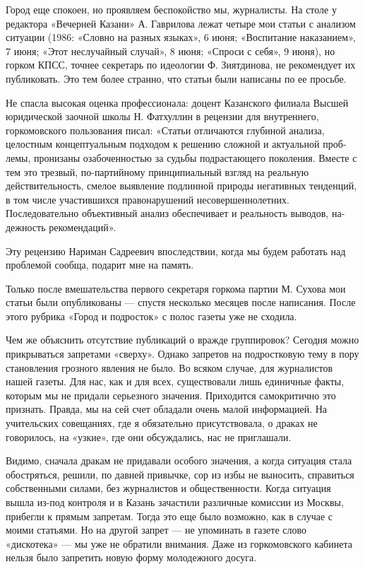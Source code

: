\documentclass[12pt, a4paper, openany]{book}
\begin{document}
Город еще спокоен, но проявляем беспокойство мы, журналисты. На столе у редактора «Вечерней Ка­зани» А. Гаврилова лежат четыре мои статьи с ана­лизом ситуации (1986: «Словно на разных языках», 6 июня; «Воспитание наказанием», 7 июня; «Этот неслучайный случай», 8 июня; «Спроси с себя», 9 июня), но горком КПСС, точнее секретарь по идеологии Ф. Зиятдинова, не рекомендует их публико­вать. Это тем более странно, что статьи были написа­ны по ее просьбе.

Не спасла высокая оценка профес­сионала: доцент Казанского филиала Высшей юриди­ческой заочной школы Н. Фатхуллин в рецензии для внут­реннего, горкомовского пользования писал: «Статьи от­личаются глубиной анализа, целостным концептуаль­ным подходом к решению сложной и актуальной проб­лемы, пронизаны озабоченностью за судьбы подрастаю­щего поколения. Вместе с тем это трезвый, по-партий­ному принципиальный взгляд на реальную действитель­ность, смелое выявление подлинной природы негативных тенденций, в том числе участившихся правонару­шений несовершеннолетних. Последовательно объектив­ный анализ обеспечивает и реальность выводов, на­дежность рекомендаций».

Эту рецензию Нариман Садреевич впоследствии, когда мы будем работать над проблемой сообща, пода­рит мне на память.

Только после вмешательства первого секретаря горкома партии М. Сухова мои статьи были опубликова­ны — спустя несколько месяцев после написания. После этого рубрика «Город и подросток» с полос газеты уже не сходила.

Чем же объяснить отсутствие публикаций о вражде группировок? Сегодня можно прикрываться запретами «сверху». Однако запретов на подростковую тему в пору становления грозного явления не было. Во вся­ком случае, для журналистов нашей газеты. Для нас, как и для всех, существовали лишь единичные факты, которым мы не придали серьезного значения. Прихо­дится самокритично это признать. Правда, мы на сей счет обладали очень малой информацией. На учительских совещаниях, где я обязательно присутствовала, о драках не говорилось, на «узкие», где они обсуждались, нас не приглашали.

Видимо, сначала дракам не придавали особого значения, а когда ситуация стала обостряться, решили, по давней привычке, сор из избы не выносить, справиться  собственными силами, без журналистов и общественности. Когда ситуация вышла из-под контроля и в Ка­зань зачастили различные комиссии из Москвы, прибегли к прямым запретам. Тогда это еще было возможно, как в случае с моими статьями. Но на другой запрет — не упоминать в газете слово «дискотека» — мы уже не обратили внимания. Даже из горкомовского кабинета нельзя было запретить новую форму молодежного досуга.
\end{document}
